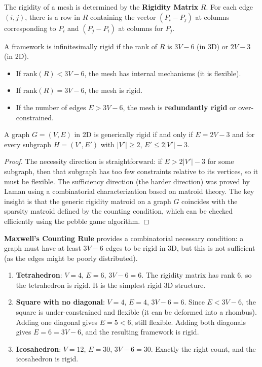 The rigidity of a mesh is determined by the \textbf{Rigidity Matrix} $R$. For each edge $(i, j)$, there is a row in $R$ containing the vector $(P_i - P_j)$ at columns corresponding to $P_i$ and $(P_j - P_i)$ at columns for $P_j$.

A framework is infinitesimally rigid if the rank of $R$ is $3V - 6$ (in 3D) or $2V - 3$ (in 2D).
\begin{itemize}
    \item If $\text{rank}(R) < 3V - 6$, the mesh has internal mechanisms (it is flexible).
    \item If $\text{rank}(R) = 3V - 6$, the mesh is rigid.
    \item If the number of edges $E > 3V - 6$, the mesh is \textbf{redundantly rigid} or over-constrained.
\end{itemize}

\begin{theorem}\label{thm:laman}
A graph $G = (V, E)$ in 2D is generically rigid if and only if $E = 2V - 3$ and for every subgraph $H = (V', E')$ with $|V'| \geq 2$, $E' \leq 2|V'| - 3$.
\end{theorem}

\begin{proof}
The necessity direction is straightforward: if $E > 2|V'| - 3$ for some subgraph, then that subgraph has too few constraints relative to its vertices, so it must be flexible. The sufficiency direction (the harder direction) was proved by Laman\cite{laman1970} using a combinatorial characterization based on matroid theory. The key insight is that the generic rigidity matroid on a graph $G$ coincides with the sparsity matroid defined by the counting condition, which can be checked efficiently using the pebble game algorithm.
\end{proof}

\textbf{Maxwell's Counting Rule} provides a combinatorial necessary condition: a graph must have at least $3V-6$ edges to be rigid in 3D, but this is not sufficient (as the edges might be poorly distributed).

\begin{example}\label{ex:rigidity}
\begin{enumerate}
    \item \textbf{Tetrahedron}: $V = 4$, $E = 6$, $3V - 6 = 6$. The rigidity matrix has rank 6, so the tetrahedron is rigid. It is the simplest rigid 3D structure.
    \item \textbf{Square with no diagonal}: $V = 4$, $E = 4$, $3V - 6 = 6$. Since $E < 3V - 6$, the square is under-constrained and flexible (it can be deformed into a rhombus). Adding one diagonal gives $E = 5 < 6$, still flexible. Adding both diagonals gives $E = 6 = 3V - 6$, and the resulting framework is rigid.
    \item \textbf{Icosahedron}: $V = 12$, $E = 30$, $3V - 6 = 30$. Exactly the right count, and the icosahedron is rigid.
\end{enumerate}
\end{example}

